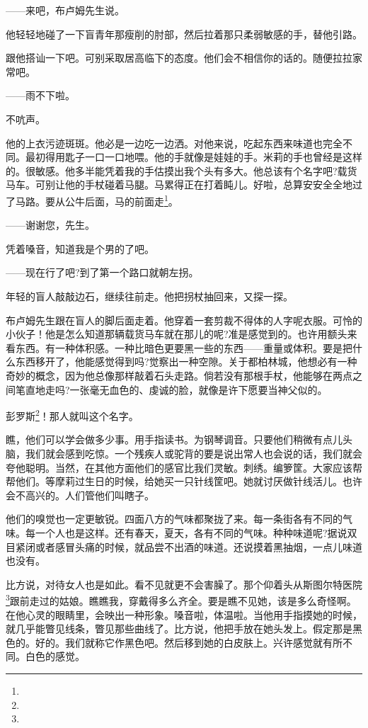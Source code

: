 \par ——来吧，布卢姆先生说。
\par 他轻轻地碰了一下盲青年那瘦削的肘部，然后拉着那只柔弱敏感的手，替他引路。
\par 跟他搭讪一下吧。可别采取居高临下的态度。他们会不相信你的话的。随便拉拉家常吧。
\par ——雨不下啦。
\par 不吭声。
\par 他的上衣污迹斑斑。他必是一边吃一边洒。对他来说，吃起东西来味道也完全不同。最初得用匙子一口一口地喂。他的手就像是娃娃的手。米莉的手也曾经是这样的。很敏感。他多半能凭着我的手估摸出我个头有多大。他总该有个名字吧?载货马车。可别让他的手杖碰着马腿。马累得正在打着盹儿。好啦，总算安安全全地过了马路。要从公牛后面，马的前面走\footnote{}。
\par ——谢谢您，先生。
\par 凭着嗓音，知道我是个男的了吧。
\par ——现在行了吧?到了第一个路口就朝左拐。
\par 年轻的盲人敲敲边石，继续往前走。他把拐杖抽回来，又探一探。
\par 布卢姆先生跟在盲人的脚后面走着。他穿着一套剪裁不得体的人字呢衣服。可怜的小伙子！他是怎么知道那辆载货马车就在那儿的呢?准是感觉到的。也许用额头来看东西。有一种体积感。一种比暗色更要黑一些的东西——重量或体积。要是把什么东西移开了，他能感觉得到吗?觉察出一种空隙。关于都柏林城，他想必有一种奇妙的概念，因为他总像那样敲着石头走路。倘若没有那根手杖，他能够在两点之间笔直地走吗?一张毫无血色的、虔诚的脸，就像是许下愿要当神父似的。
\par 彭罗斯\footnote{}！那人就叫这个名字。
\par 瞧，他们可以学会做多少事。用手指读书。为钢琴调音。只要他们稍微有点儿头脑，我们就会感到吃惊。一个残疾人或驼背的要是说出常人也会说的话，我们就会夸他聪明。当然，在其他方面他们的感官比我们灵敏。刺绣。编箩筐。大家应该帮帮他们。等摩莉过生日的时候，给她买一只针线筐吧。她就讨厌做针线活儿。也许会不高兴的。人们管他们叫瞎子。
\par 他们的嗅觉也一定更敏锐。四面八方的气味都聚拢了来。每一条街各有不同的气味。每一个人也是这样。还有春天，夏天，各有不同的气味。种种味道呢?据说双目紧闭或者感冒头痛的时候，就品尝不出酒的味道。还说摸着黑抽烟，一点儿味道也没有。
\par 比方说，对待女人也是如此。看不见就更不会害臊了。那个仰着头从斯图尔特医院\footnote{}跟前走过的姑娘。瞧瞧我，穿戴得多么齐全。要是瞧不见她，该是多么奇怪啊。在他心灵的眼睛里，会映出一种形象。嗓音啦，体温啦。当他用手指摸她的时候，就几乎能瞥见线条，瞥见那些曲线了。比方说，他把手放在她头发上。假定那是黑色的。好的。我们就称它作黑色吧。然后移到她的白皮肤上。兴许感觉就有所不同。白色的感觉。
